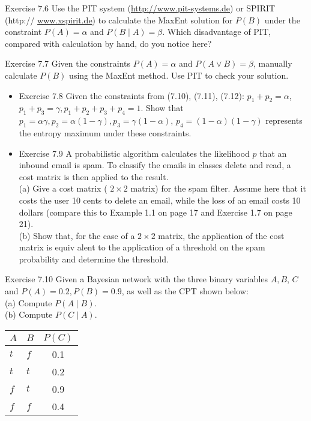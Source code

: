 \documentclass[10pt]{article}
\begin{document}
Exercise 7.6 Use the PIT system (\href{http://www.pit-systems.de}{http://www.pit-systems.de}) or SPIRIT (http:// \href{http://www.xspirit.de}{www.xspirit.de}) to calculate the MaxEnt solution for $P(B)$ under the constraint $P(A)=\alpha$ and $P(B \mid A)=\beta$. Which disadvantage of PIT, compared with calculation by hand, do you notice here?

Exercise 7.7 Given the constraints $P(A)=\alpha$ and $P(A \vee B)=\beta$, manually calculate $P(B)$ using the MaxEnt method. Use PIT to check your solution.

\begin{itemize}
  \item Exercise 7.8 Given the constraints from (7.10), (7.11), (7.12): $p_{1}+p_{2}=\alpha$, $p_{1}+p_{3}=\gamma, p_{1}+p_{2}+p_{3}+p_{4}=1$. Show that $p_{1}=\alpha \gamma, p_{2}=\alpha(1-\gamma), p_{3}=\gamma(1-\alpha)$, $p_{4}=(1-\alpha)(1-\gamma)$ represents the entropy maximum under these constraints.
  \item Exercise 7.9 A probabilistic algorithm calculates the likelihood $p$ that an inbound email is spam. To classify the emails in classes delete and read, a cost matrix is then applied to the result.\\
(a) Give a cost matrix ( $2 \times 2$ matrix) for the spam filter. Assume here that it costs the user 10 cents to delete an email, while the loss of an email costs 10 dollars (compare this to Example 1.1 on page 17 and Exercise 1.7 on page 21).\\
(b) Show that, for the case of a $2 \times 2$ matrix, the application of the cost matrix is equiv
alent to the application of a threshold on the spam probability and determine the threshold.
\end{itemize}

Exercise 7.10 Given a Bayesian network with the three binary variables $A, B$, $C$ and $P(A)=0.2, P(B)=0.9$, as well as the CPT shown below:\\
(a) Compute $P(A \mid B)$.\\
(b) Compute $P(C \mid A)$.

\begin{center}
\begin{tabular}{llc}
\hline
$A$ & $B$ & $P(C)$ \\
\hline
$t$ & $f$ & 0.1 \\
\hline
$t$ & $t$ & 0.2 \\
\hline
$f$ & $t$ & 0.9 \\
\hline
$f$ & $f$ & 0.4 \\
\hline
\end{tabular}
\end{center}
\end{document}
